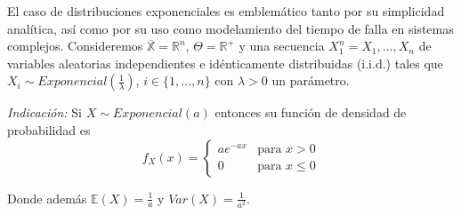 \documentclass[
  11pt,
  letterpaper,
   addpoints,
   answers
  ]{exam}
\begin{document}
\newpage
\begin{questions}
\question El caso de distribuciones exponenciales es emblemático tanto por su simplicidad analítica, así como por su uso como modelamiento del tiempo de falla en sistemas complejos. Consideremos $\overline{\mathbb{X}} = \mathbb{R}^n$, $\Theta = \mathbb{R}^+$ y una secuencia $X_1^n = X_1, ..., X_n$ de variables aleatorias independientes e idénticamente distribuidas (i.i.d.) tales que $X_i \sim Exponencial\left(\frac{1}{\lambda}\right)$, $i \in \{1, ..., n\}$ con $\lambda > 0$ un parámetro.

\textit{Indicación:} Si $X \sim Exponencial(a)$ entonces su función de densidad de probabilidad es
\[
f_X(x) = \begin{cases}
ae^{-ax} & \text{para } x > 0 \\
0 & \text{para } x \leq 0
\end{cases}
\]

Donde además $\mathbb{E}(X) = \frac{1}{a}$ y $Var(X) = \frac{1}{a^2}$.

\end{questions}
\end{document}
